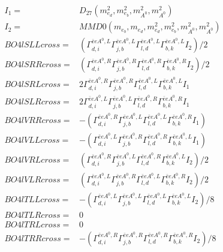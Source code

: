 \documentclass[A4,landscape]{article}
\begin{document}
\begin{align} 
I_1 = & D_{27}(m^2_{e_{{d}}}, m^2_{e_{{b}}}, m^2_{A^0}, m^2_{A^0}) \\ 
I_2 = & MMD0(m_{e_{{b}}}, m_{e_{{d}}}, m^2_{e_{{d}}}, m^2_{e_{{b}}}, m^2_{A^0}, m^2_{A^0}) \\ 
  BO4lSLLcross= & ( \Gamma^{\bar{e}e A^0 ,L}_{d, i} \Gamma^{\bar{e}e A^0 ,L}_{j, b} \Gamma^{\bar{e}e A^0 ,L}_{l, d} \Gamma^{\bar{e}e A^0 ,L}_{b, k} I_2)/2 \\ 
  BO4lSRRcross= & ( \Gamma^{\bar{e}e A^0 ,R}_{d, i} \Gamma^{\bar{e}e A^0 ,R}_{j, b} \Gamma^{\bar{e}e A^0 ,R}_{l, d} \Gamma^{\bar{e}e A^0 ,R}_{b, k} I_2)/2 \\ 
  BO4lSRLcross= & 2  \Gamma^{\bar{e}e A^0 ,R}_{d, i} \Gamma^{\bar{e}e A^0 ,R}_{j, b} \Gamma^{\bar{e}e A^0 ,L}_{l, d} \Gamma^{\bar{e}e A^0 ,L}_{b, k} I_1 \\ 
  BO4lSLRcross= & 2  \Gamma^{\bar{e}e A^0 ,L}_{d, i} \Gamma^{\bar{e}e A^0 ,L}_{j, b} \Gamma^{\bar{e}e A^0 ,R}_{l, d} \Gamma^{\bar{e}e A^0 ,R}_{b, k} I_1 \\ 
  BO4lVRRcross= & -( \Gamma^{\bar{e}e A^0 ,R}_{d, i} \Gamma^{\bar{e}e A^0 ,L}_{j, b} \Gamma^{\bar{e}e A^0 ,L}_{l, d} \Gamma^{\bar{e}e A^0 ,R}_{b, k} I_1) \\ 
  BO4lVLLcross= & -( \Gamma^{\bar{e}e A^0 ,L}_{d, i} \Gamma^{\bar{e}e A^0 ,R}_{j, b} \Gamma^{\bar{e}e A^0 ,R}_{l, d} \Gamma^{\bar{e}e A^0 ,L}_{b, k} I_1) \\ 
  BO4lVRLcross= & ( \Gamma^{\bar{e}e A^0 ,R}_{d, i} \Gamma^{\bar{e}e A^0 ,L}_{j, b} \Gamma^{\bar{e}e A^0 ,R}_{l, d} \Gamma^{\bar{e}e A^0 ,L}_{b, k} I_2)/2 \\ 
  BO4lVLRcross= & ( \Gamma^{\bar{e}e A^0 ,L}_{d, i} \Gamma^{\bar{e}e A^0 ,R}_{j, b} \Gamma^{\bar{e}e A^0 ,L}_{l, d} \Gamma^{\bar{e}e A^0 ,R}_{b, k} I_2)/2 \\ 
  BO4lTLLcross= & -( \Gamma^{\bar{e}e A^0 ,L}_{d, i} \Gamma^{\bar{e}e A^0 ,L}_{j, b} \Gamma^{\bar{e}e A^0 ,L}_{l, d} \Gamma^{\bar{e}e A^0 ,L}_{b, k} I_2)/8 \\ 
  BO4lTLRcross= & 0 \\ 
  BO4lTRLcross= & 0 \\ 
  BO4lTRRcross= & -( \Gamma^{\bar{e}e A^0 ,R}_{d, i} \Gamma^{\bar{e}e A^0 ,R}_{j, b} \Gamma^{\bar{e}e A^0 ,R}_{l, d} \Gamma^{\bar{e}e A^0 ,R}_{b, k} I_2)/8 \\ 
\end{align} 
\end{document}
